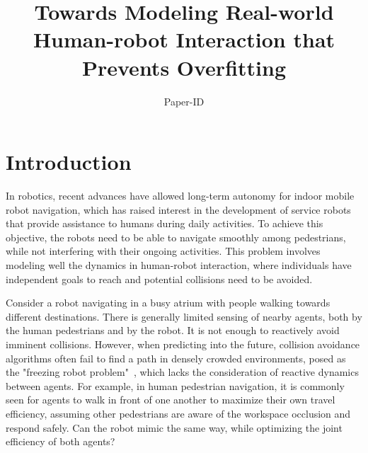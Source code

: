 \documentclass[conference]{IEEEtran}
\begin{document}
\title{Towards Modeling Real-world Human-robot Interaction that Prevents Overfitting}

\author{Paper-ID}



\maketitle


\IEEEpeerreviewmaketitle


\section{Introduction}
\vspace{-0.3em}
\label{sec:intro}
\noindent
In robotics, recent advances have allowed long-term autonomy for indoor mobile 
robot navigation, which has raised interest in the development of service 
robots that provide assistance to humans during daily activities. To achieve 
this objective, the robots need to be able to navigate smoothly among pedestrians, while 
not interfering with their ongoing activities. This problem involves 
modeling well the dynamics in human-robot interaction, where individuals have 
independent goals to reach and potential collisions need to be avoided. 

Consider a robot navigating in a busy atrium with people walking towards 
different destinations. There is generally limited sensing of nearby agents, 
both by the human pedestrians and by the robot. It is not enough to reactively 
avoid imminent collisions. However, when predicting into the future, 
collision avoidance algorithms often fail to find a path in 
densely crowded environments, posed as the "freezing robot 
problem"~\cite{trautman2010unfreezing}, which lacks the consideration of reactive 
dynamics between agents. For example, in human pedestrian 
navigation, it is commonly seen for agents to walk in front of one 
another to maximize their own travel efficiency, assuming other pedestrians 
are aware of the workspace occlusion and respond safely. Can the robot mimic 
the same way, while optimizing the joint efficiency of both agents?  
\end{document}
